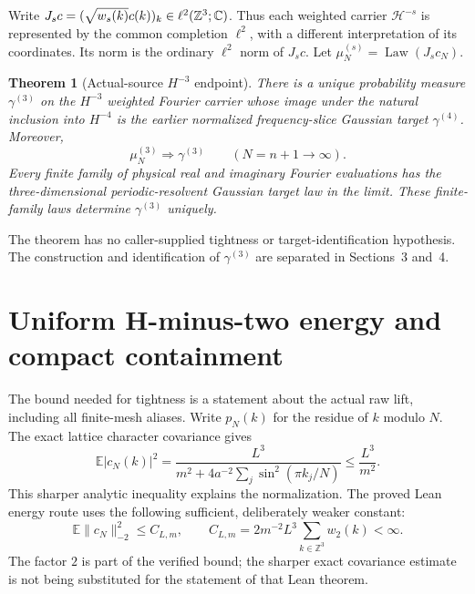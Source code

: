 \documentclass[11pt]{amsart}
\newtheorem{theorem}{Theorem}[section]
\theoremstyle{remark}\newtheorem{remark}[theorem]{Remark}
\newcommand{\Z}{\mathbb Z}\newcommand{\E}{\mathbb E}
\newcommand{\HH}[1]{\mathcal H^{-#1}}
\newcommand{\norm}[1]{\lVert#1\rVert}
\newcommand{\Law}{\operatorname{Law}}
\begin{document}
Write $J_s c=(\sqrt{w_s(k)}c(k))_k\in\ell^2(\Z^3;\C)$. Thus each weighted carrier $\HH{s}$ is represented by the common completion $\ell^2$, with a different interpretation of its coordinates. Its norm is the ordinary $\ell^2$ norm of $J_sc$. Let $\mu_N^{(s)}=\Law(J_s c_N)$.

\begin{theorem}[Actual-source $H^{-3}$ endpoint]\label{thm:endpoint}
There is a unique probability measure $\gamma^{(3)}$ on the $H^{-3}$ weighted Fourier carrier whose image under the natural inclusion into $H^{-4}$ is the earlier normalized frequency-slice Gaussian target $\gamma^{(4)}$. Moreover,
\[
 \mu_N^{(3)}\Longrightarrow\gamma^{(3)}\qquad(N=n+1\longrightarrow\infty).
\]
Every finite family of physical real and imaginary Fourier evaluations has the three-dimensional periodic-resolvent Gaussian target law in the limit. These finite-family laws determine $\gamma^{(3)}$ uniquely.
\end{theorem}
The theorem has no caller-supplied tightness or target-identification hypothesis. The construction and identification of $\gamma^{(3)}$ are separated in Sections~3 and~4.

\section{Uniform H-minus-two energy and compact containment}
The bound needed for tightness is a statement about the actual raw lift, including all finite-mesh aliases. Write $p_N(k)$ for the residue of $k$ modulo $N$. The exact lattice character covariance gives
\[
 \E|c_N(k)|^2=\frac{L^3}{m^2+4a^{-2}\sum_j\sin^2(\pi k_j/N)}
 \leq \frac{L^3}{m^2}.
\]
This sharper analytic inequality explains the normalization. The proved Lean energy route uses the following sufficient, deliberately weaker constant:
\begin{equation}\label{eq:energy}
 \E\norm{c_N}_{-2}^2\leq C_{L,m},\qquad
 C_{L,m}=2m^{-2}L^3\sum_{k\in\Z^3}w_2(k)<\infty.
\end{equation}
The factor $2$ is part of the verified bound; the sharper exact covariance estimate is not being substituted for the statement of that Lean theorem.
\end{document}
